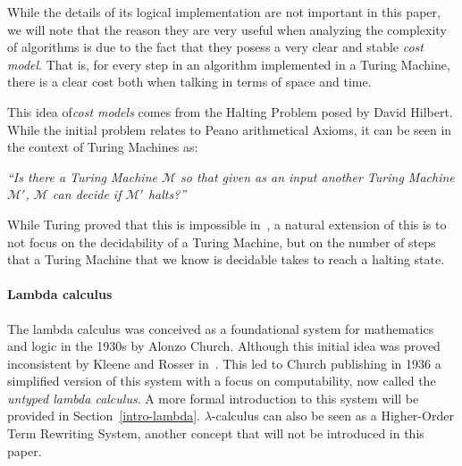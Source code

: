\documentclass[12pt]{article}
\begin{document}
While the details of its logical implementation are not important in this paper, we will note that the reason they are very useful when analyzing the complexity of algorithms is due to the fact that they posess a very clear and stable \textit{cost model}. That is, for every step in an algorithm implemented in a Turing Machine, there is a clear cost both when talking in terms of space and time.

This idea of\textit{cost models} comes from the Halting Problem posed by David Hilbert. While the initial problem relates to Peano arithmetical Axioms, it can be seen in the context of Turing Machines as:

\begin{center}
\textit{\enquote{Is there a Turing Machine $\mathcal{M}$ so that given as an input another Turing Machine $\mathcal{M}'$, $\mathcal{M}$ can decide if $\mathcal{M}'$ halts?}}
\end{center}

While Turing proved that this is impossible in~\cite{on-computable-numbers}, a natural extension of this is to not focus on the decidability of a Turing Machine, but on the number of steps that a Turing Machine that we know is decidable takes to reach a halting state.


\paragraph{Lambda calculus}
The lambda calculus was conceived as a foundational system for mathematics and logic in the 1930s by Alonzo Church. Although this initial idea was proved inconsistent by Kleene and Rosser in~\cite{rosser-kleene-inconsistency}. This led to Church publishing in 1936 a simplified version of this system with a focus on computability, now called the \textit{untyped lambda calculus}. A more formal introduction to this system will be provided in Section~\ref{intro-lambda}. $\lambda$-calculus can also be seen as a Higher-Order Term Rewriting System, another concept that will not be introduced in this paper.
\end{document}
